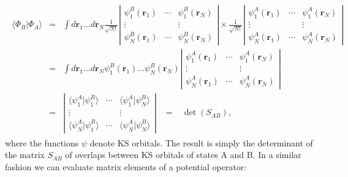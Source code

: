 \documentclass[letterpaper,10pt,english]{sphinxmanual}
\begin{document}
\begin{equation*}
\begin{split}\begin{aligned}
\langle\Phi_{B}|\Phi_{A}\rangle & = & \int d\mathbf{r}_{1}\ldots d\mathbf{r}_{N}\frac{1}{\sqrt{N!}}\left|\begin{array}{ccc}
\psi_{1}^{B}(\mathbf{r}_{1}) & \cdots & \psi_{1}^{B}(\mathbf{r}_{N})\\
\vdots &  & \vdots\\
\psi_{N}^{B}(\mathbf{r}_{1}) & \cdots & \psi_{N}^{B}(\mathbf{r}_{N})
\end{array}\right|\times\frac{1}{\sqrt{N!}}\left|\begin{array}{ccc}
\psi_{1}^{A}(\mathbf{r}_{1}) & \cdots & \psi_{1}^{A}(\mathbf{r}_{N})\\
\vdots &  & \vdots\\
\psi_{N}^{A}(\mathbf{r}_{1}) & \cdots & \psi_{N}^{A}(\mathbf{r}_{N})
\end{array}\right|\nonumber \\
 & = & \int d\mathbf{r}_{1}\ldots d\mathbf{r}_{N}\psi_{1}^{B}(\mathbf{r}_{1})\ldots\psi_{N}^{B}(\mathbf{r}_{N})\left|\begin{array}{ccc}
\psi_{1}^{A}(\mathbf{r}_{1}) & \cdots & \psi_{1}^{A}(\mathbf{r}_{N})\\
\vdots &  & \vdots\\
\psi_{N}^{A}(\mathbf{r}_{1}) & \cdots & \psi_{N}^{A}(\mathbf{r}_{N})
\end{array}\right|\nonumber \\
 & = & \left|\begin{array}{ccc}
\langle\psi_{1}^{A}|\psi_{1}^{B}\rangle & \cdots & \langle\psi_{1}^{A}|\psi_{N}^{B}\rangle\\
\vdots &  & \vdots\\
\langle\psi_{N}^{A}|\psi_{1}^{B}\rangle & \cdots & \langle\psi_{N}^{A}|\psi_{N}^{B}\rangle
\end{array}\right|\;\;\;=\;\;\;\det\left(S_{AB}\right),\end{aligned}\end{split}
\end{equation*}
where the functions \(\psi\) denote KS orbitals. The result is
simply the determinant of the matrix \(S_{AB}\) of overlaps between
KS orbitals of states A and B. In a similar fashion we can evaluate
matrix elements of a potential operator:
\end{document}
